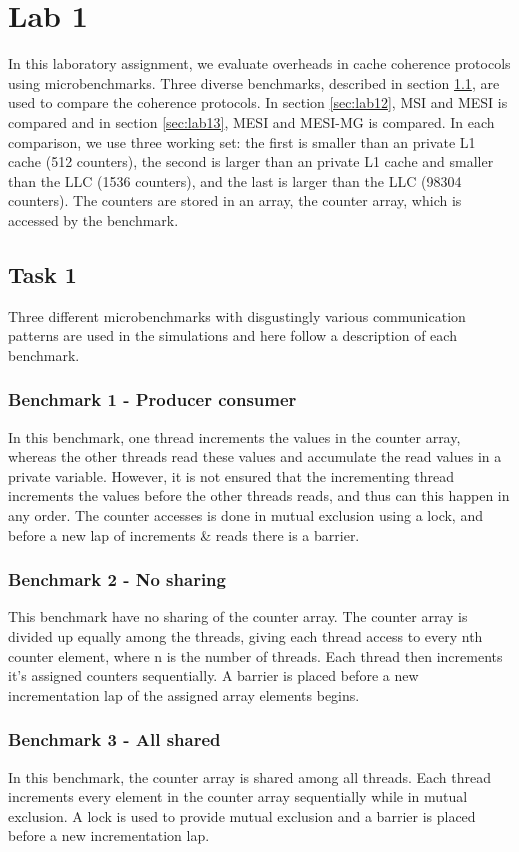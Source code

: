 \section{Lab 1}
\label{sec:lab1}
In this laboratory assignment, we evaluate overheads in cache coherence protocols using microbenchmarks. Three diverse benchmarks, described in section \ref{sec:lab11}, are used to compare the coherence protocols. In section \ref{sec:lab12}, MSI and MESI is compared and in section \ref{sec:lab13}, MESI and MESI-MG is compared. In each comparison, we use three working set: the first is smaller than an private L1 cache (512 counters), the second is larger than an private L1 cache and smaller than the LLC (1536 counters), and the last is larger than the LLC (98304 counters). The counters are stored in an array, the counter array, which is accessed by the benchmark.

\subsection{Task 1}
\label{sec:lab11}
Three different microbenchmarks with disgustingly various communication patterns are used in the simulations and here follow a description of each benchmark.
\subsubsection*{Benchmark 1 - Producer consumer}
In this benchmark, one thread increments the values in the counter array, whereas the other threads read these values and accumulate the read values in a private variable. However, it is not ensured that the incrementing thread increments the values before the other threads reads, and thus can this happen in any order. The counter accesses is done in mutual exclusion using a lock, and before a new lap of increments \& reads there is a barrier.

\subsubsection*{Benchmark 2 - No sharing}
This benchmark have no sharing of the counter array. The counter array is divided up equally among the threads, giving each thread access to every nth counter element, where n is the number of threads. Each thread then increments it's assigned counters sequentially. A barrier is placed before a new incrementation lap of the assigned array elements begins. 

\subsubsection*{Benchmark 3 - All shared}
In this benchmark, the counter array is shared among all threads. Each thread increments every element in the counter array sequentially while in mutual exclusion. A lock is used to provide mutual exclusion and a barrier is placed before a new incrementation lap. 

